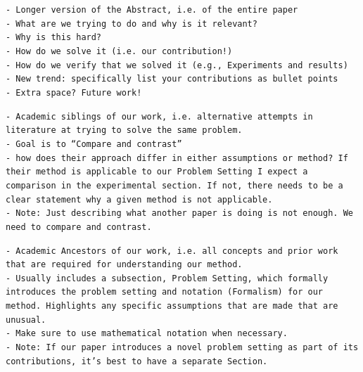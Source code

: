\documentclass[11pt, a4paper]{gdm_format}
\begin{document}
\begin{tcolorbox}[breakable,colback=orange!5!white, colframe=orange!80!black, title=paper-solve Section Tip (Introduction)]
\texttt{- Longer version of the Abstract, i.e. of the entire paper\\- What are we trying to do and why is it relevant?\\- Why is this hard? \\- How do we solve it (i.e. our contribution!)\\- How do we verify that we solved it (e.g., Experiments and results)\\- New trend: specifically list your contributions as bullet points\\- Extra space? Future work!}
\end{tcolorbox}


\begin{tcolorbox}[breakable,colback=orange!5!white, colframe=orange!80!black, title=paper-solve Section Tip (Related Work)]
\texttt{- Academic siblings of our work, i.e. alternative attempts in literature at trying to solve the same problem.\\- Goal is to “Compare and contrast” \\- how does their approach differ in either assumptions or method? If their method is applicable to our Problem Setting I expect a comparison in the experimental section. If not, there needs to be a clear statement why a given method is not applicable.\\- Note: Just describing what another paper is doing is not enough. We need to compare and contrast.}
\end{tcolorbox}



\begin{tcolorbox}[breakable,colback=orange!5!white, colframe=orange!80!black, title=paper-solve Section Tip (Background)]
\texttt{- Academic Ancestors of our work, i.e. all concepts and prior work that are required for understanding our method. \\- Usually includes a subsection, Problem Setting, which formally introduces the problem setting and notation (Formalism) for our method. Highlights any specific assumptions that are made that are unusual.\\- Make sure to use mathematical notation when necessary.\\- Note: If our paper introduces a novel problem setting as part of its contributions, it's best to have a separate Section.}
\end{tcolorbox}
\end{document}

